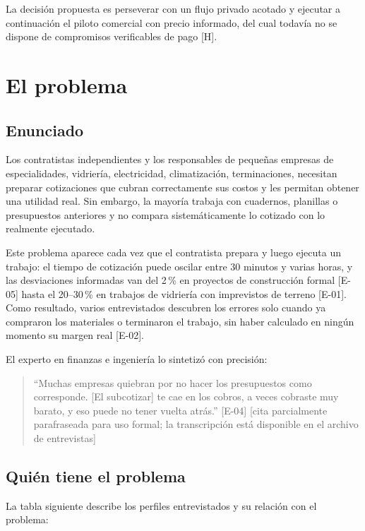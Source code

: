 \documentclass[11pt]{article}
\newcommand{\ev}[1]{\textcolor{prblue}{[#1]}}
\newcommand{\hip}{\textcolor{prorange}{[H]}}
\begin{document}
La decisión propuesta es perseverar con un flujo privado acotado y ejecutar a
continuación el piloto comercial con precio informado, del cual todavía no se
dispone de compromisos verificables de pago \hip.

\section{El problema}

\subsection{Enunciado}

Los contratistas independientes y los responsables de pequeñas empresas de
especialidades, vidriería, electricidad, climatización, terminaciones, necesitan
preparar cotizaciones que cubran correctamente sus costos y les permitan obtener
una utilidad real. Sin embargo, la mayoría trabaja con cuadernos, planillas o
presupuestos anteriores y no compara sistemáticamente lo cotizado con lo realmente
ejecutado.

Este problema aparece cada vez que el contratista prepara y luego ejecuta un
trabajo: el tiempo de cotización puede oscilar entre 30 minutos y varias horas,
y las desviaciones informadas van del 2\,\% en proyectos de construcción formal
\ev{E-05} hasta el 20--30\,\% en trabajos de vidriería con imprevistos de terreno
\ev{E-01}. Como resultado, varios entrevistados descubren los errores solo cuando
ya compraron los materiales o terminaron el trabajo, sin haber calculado en ningún
momento su margen real \ev{E-02}.

El experto en finanzas e ingeniería lo sintetizó con precisión:
\begin{quote}
``Muchas empresas quiebran por no hacer los presupuestos como corresponde.
[El subcotizar] te cae en los cobros, a veces cobraste muy barato, y eso
puede no tener vuelta atrás.'' \ev{E-04} [cita parcialmente parafraseada
para uso formal; la transcripción está disponible en el archivo de entrevistas]
\end{quote}

\subsection{Quién tiene el problema}

La tabla siguiente describe los perfiles entrevistados y su relación con el problema:
\end{document}

